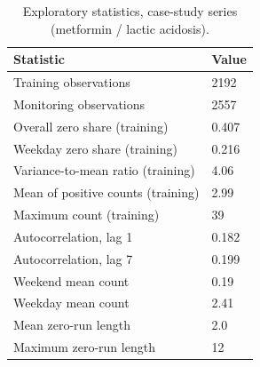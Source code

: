 \begin{table}

\caption{Exploratory statistics, case-study series (metformin / lactic acidosis).}
\centering
\begin{tabular}[t]{ll}
\toprule
Statistic & Value\\
\midrule
Training observations & 2192\\
Monitoring observations & 2557\\
Overall zero share (training) & 0.407\\
Weekday zero share (training) & 0.216\\
Variance-to-mean ratio (training) & 4.06\\
\addlinespace
Mean of positive counts (training) & 2.99\\
Maximum count (training) & 39\\
Autocorrelation, lag 1 & 0.182\\
Autocorrelation, lag 7 & 0.199\\
Weekend mean count & 0.19\\
\addlinespace
Weekday mean count & 2.41\\
Mean zero-run length & 2.0\\
Maximum zero-run length & 12\\
\bottomrule
\end{tabular}
\end{table}
